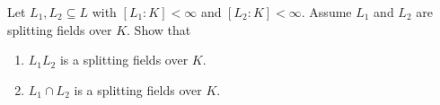 \begin{exercise}
  Let $L_1, L_2 \subseteq L$ with $[L_1 : K] < \infty$ and $[L_2 : K] < \infty$.
  Assume $L_1$ and $L_2$ are splitting fields over $K$. Show that
  \begin{enumerate}
    \item $L_1L_2$ is a splitting fields over $K$.
    \item $L_1 \cap L_2$ is a splitting fields over $K$.
  \end{enumerate}
\end{exercise}
